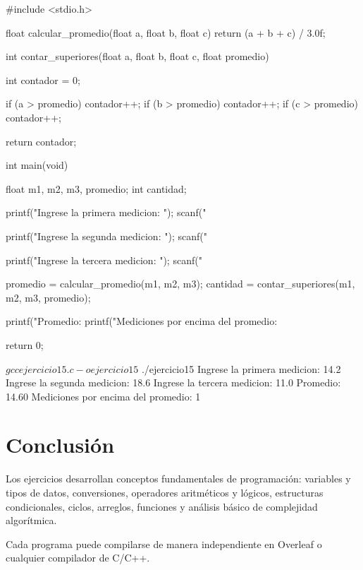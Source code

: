 \documentclass[11pt, a4paper]{article}
\begin{document}
\begin{codebox}[title={CÓDIGO FUENTE EN C: Ejercicio 15}]
#include <stdio.h>

float calcular_promedio(float a, float b, float c) {
    return (a + b + c) / 3.0f;
}

int contar_superiores(float a, float b, float c, float promedio) {
    int contador = 0;

    if (a > promedio) contador++;
    if (b > promedio) contador++;
    if (c > promedio) contador++;

    return contador;
}

int main(void) {
    float m1, m2, m3, promedio;
    int cantidad;

    printf("Ingrese la primera medicion: ");
    scanf("%

    printf("Ingrese la segunda medicion: ");
    scanf("%

    printf("Ingrese la tercera medicion: ");
    scanf("%

    promedio = calcular_promedio(m1, m2, m3);
    cantidad = contar_superiores(m1, m2, m3, promedio);

    printf("Promedio: %
    printf("Mediciones por encima del promedio: %

    return 0;
}
\end{codebox}

\begin{terminalout}
$ gcc ejercicio15.c -o ejercicio15
$ ./ejercicio15
Ingrese la primera medicion: 14.2
Ingrese la segunda medicion: 18.6
Ingrese la tercera medicion: 11.0
Promedio: 14.60
Mediciones por encima del promedio: 1
\end{terminalout}

\newpage

\section*{Conclusión}

Los ejercicios desarrollan conceptos fundamentales de programación: variables y tipos de datos, conversiones, operadores aritméticos y lógicos, estructuras condicionales, ciclos, arreglos, funciones y análisis básico de complejidad algorítmica.

Cada programa puede compilarse de manera independiente en Overleaf o cualquier compilador de C/C++.
\end{document}
